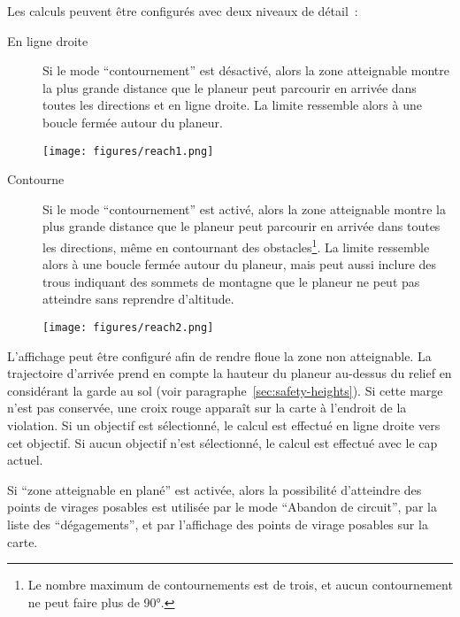 Les calculs peuvent être configurés  avec deux niveaux de détail~:
\begin{description}
\item[En ligne droite] Si le mode ``contournement'' est désactivé, alors la
zone atteignable montre la plus grande distance que le planeur peut parcourir en arrivée dans toutes les directions et en
ligne droite. La limite ressemble alors à une boucle fermée autour du planeur.

\begin{center}
\texttt{[image: figures/reach1.png]}
\end{center}
 
\item[Contourne] Si le mode ``contournement'' est activé, alors la zone atteignable montre la 
plus grande distance que le planeur peut parcourir en arrivée dans toutes les directions, 
même en contournant des obstacles\footnote{Le nombre maximum de contournements est
de trois, et aucun contournement ne peut faire plus de 90°.}.  La
limite ressemble alors à une boucle fermée autour du planeur, mais peut aussi 
inclure des trous indiquant des sommets de montagne que le planeur ne peut pas atteindre
sans reprendre d'altitude.

\begin{center}
\texttt{[image: figures/reach2.png]}
\end{center}

\end{description}

L'affichage peut être configuré afin de rendre floue la zone
non atteignable. 
La trajectoire d'arrivée prend en compte la hauteur du planeur au-dessus du relief
en considérant la garde au sol (voir paragraphe~\ref{sec:safety-heights}).
Si cette marge n'est pas conservée, une croix rouge apparaît sur la carte à l'endroit de la violation.
Si un objectif est sélectionné, le calcul est effectué en ligne droite vers cet objectif.
Si aucun objectif n'est sélectionné, le calcul est effectué avec le cap actuel.

Si ``zone atteignable en plané'' est activée, alors la possibilité d'atteindre des points
de virages posables est utilisée par le mode ``Abandon de circuit'', par la liste des ``dégagements'',
et par l'affichage des points de virage posables sur la carte.

